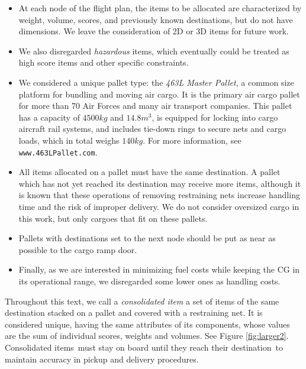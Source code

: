 \documentclass[preprint,authoryear]{elsarticle}
\begin{document}
\begin{itemize}
	
	\item At each node of the flight plan, the items to be allocated are characterized by weight, volume, scores, and previously known destinations, but do not have dimensions. We leave the consideration of 2D or 3D items for future work.
	
	\item We also disregarded {\it hazardous} items, which eventually could be treated as high score items and other specific constraints.
	
	\item We considered a unique pallet type: the {\it 463L Master Pallet}, a common size platform for bundling and moving air cargo. It is the primary air cargo pallet for more than 70 Air Forces and many air transport companies. This pallet has a capacity of $4500 kg$ and $14.8 m^3$, is equipped for locking into cargo aircraft rail systems, and includes tie-down rings to secure nets and cargo loads, which in total weighs $140 kg$. For more information, see {\tt www.463LPallet.com}.
	
	\item All items allocated on a pallet must have the same destination. A pallet which has not yet reached its destination may receive more items, although it is known that these operations of removing restraining nets increase handling time and the risk of improper delivery. We do not consider oversized cargo in this work, but only cargoes that fit on these pallets.
	
	\item Pallets with destinations set to the next node should be put as near as possible to the cargo ramp door.

	\item Finally, as we are interested in minimizing fuel costs while keeping the CG in its operational range, we disregarded some lower ones as handling costs.

\end{itemize}

Throughout this text, we call a {\it consolidated item} a set of items of the same destination stacked on a pallet and covered with a restraining net. It is considered unique, having the same attributes of its components, whose values are the sum of individual scores, weights and volumes. See Figure \ref{fig:larger2}.
Consolidated items must stay on board until they reach their destination to maintain accuracy in pickup and delivery procedures.
\end{document}

